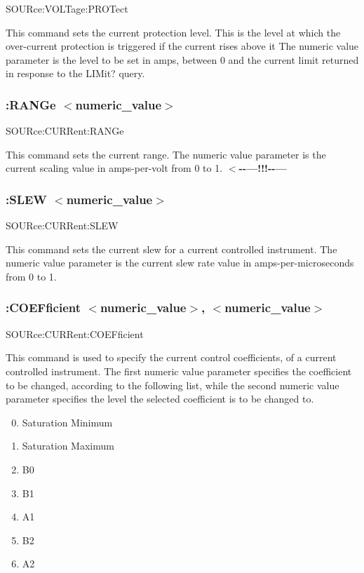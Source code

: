 {\ttfamily S\-O\-U\-Rce\-:\-V\-O\-L\-Tage\-:P\-R\-O\-Tect}\par
 This command sets the current protection level. This is the level at which the over-\/current protection is triggered if the current rises above it The numeric value parameter is the level to be set in amps, between 0 and the current limit returned in response to the L\-I\-Mit? query.\hypertarget{a00002_sourcurrrang}{}\subsubsection{\-:\-R\-A\-N\-Ge $<$numeric\-\_\-value$>$}\label{a00002_sourcurrrang}
{\ttfamily S\-O\-U\-Rce\-:\-C\-U\-R\-Rent\-:R\-A\-N\-Ge}\par
 This command sets the current range. The numeric value parameter is the current scaling value in amps-\/per-\/volt from 0 to 1. {\bfseries $<$-\/-\/---!!!-\/-\/---}\hypertarget{a00002_sourcurrslew}{}\subsubsection{\-:\-S\-L\-E\-W $<$numeric\-\_\-value$>$}\label{a00002_sourcurrslew}
{\ttfamily S\-O\-U\-Rce\-:\-C\-U\-R\-Rent\-:S\-L\-E\-W}\par
 This command sets the current slew for a current controlled instrument. The numeric value parameter is the current slew rate value in amps-\/per-\/microseconds from 0 to 1.\hypertarget{a00002_sourcurrcoef}{}\subsubsection{\-:\-C\-O\-E\-Fficient $<$numeric\-\_\-value$>$, $<$numeric\-\_\-value$>$}\label{a00002_sourcurrcoef}
{\ttfamily S\-O\-U\-Rce\-:\-C\-U\-R\-Rent\-:C\-O\-E\-Fficient}\par
 This command is used to specify the current control coefficients, of a current controlled instrument. The first numeric value parameter specifies the coefficient to be changed, according to the following list, while the second numeric value parameter specifies the level the selected coefficient is to be changed to.

\begin{enumerate}\setcounter{enumi}{-1} \item Saturation Minimum \item Saturation Maximum \item B0 \item B1 \item A1 \item B2 \item A2 \end{enumerate}

